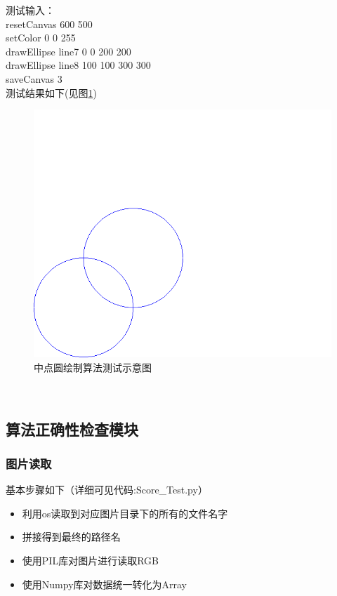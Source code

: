 \documentclass[a4paper,UTF8]{article}
\theoremstyle{definition}
\begin{document}
测试输入：\\
\indent resetCanvas 600 500\\
\indent setColor 0 0 255\\
\indent drawEllipse line7 0 0 200 200\\
\indent drawEllipse line8 100 100 300 300\\
\indent saveCanvas 3\\
测试结果如下(见图\ref{fig:circletest})
\begin{figure}[h]
	\centering
	\includegraphics[scale=0.3]{figure/circletest.png}
	\caption{中点圆绘制算法测试示意图}
	\label{fig:circletest}
\end{figure}\\


\subsection{算法正确性检查模块}
\subsubsection{图片读取}
基本步骤如下（详细可见代码:Score\_Test.py）

\begin{itemize}
    \item [(1)] 
    利用os读取到对应图片目录下的所有的文件名字
    \item [(2)]
    拼接得到最终的路径名
    \item [(3)]
    使用PIL库对图片进行读取RGB
    \item [(4)]
    使用Numpy库对数据统一转化为Array
  \end{itemize}
\end{document}
